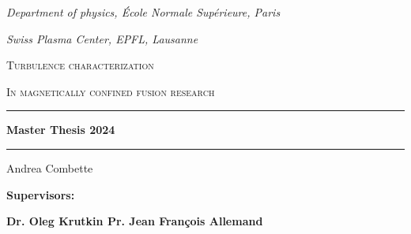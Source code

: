 \documentclass[11pt,a4paper]{report}
\author{Andrea}
\begin{document}
\begin{titlepage}
    \begin{center}
        \vspace*{2cm}
        \emph{\footnotesize{Department of physics, École Normale Supérieure, Paris}}

        \emph{\footnotesize{Swiss Plasma Center, EPFL, Lausanne}}


        \vspace*{1cm}

        \textsc{Turbulence characterization}

        \textsc{In magnetically confined fusion research}
        \vspace*{1cm}

        \rule{14cm}{2pt}\vspace{.7cm}

        \Large{\textbf{Master Thesis 2024}}

        \vspace{.5cm}
        \rule{14cm}{2pt}
        \vspace{1cm}

        \Large Andrea Combette

        \vspace{3cm}

        \raisebox{-5pt}{\quad\decofourleft\decotwo\decofourright\quad}

        \vspace{2cm}
        \vspace{1cm}

        \begin{minipage}{14cm}
            \small{\textbf{Supervisors:}}
            \vspace{.5cm}

            \small{\textbf{Dr. Oleg Krutkin \null\hfill Pr. Jean François Allemand}}

        \end{minipage}
        \vspace{2cm}



\end{center}
\end{titlepage}
\end{document}

